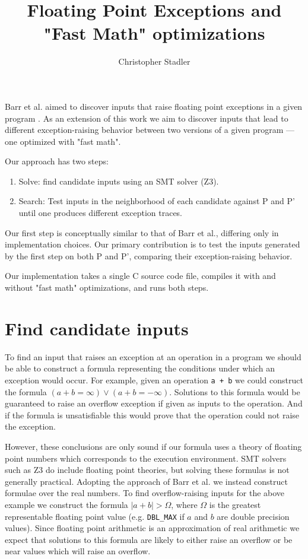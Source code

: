 \documentclass{article}
\begin{document}
\title{Floating Point Exceptions and "Fast Math" optimizations}
\author{Christopher Stadler}

Barr et al. aimed to discover inputs that raise floating point exceptions
in a given program \cite{barr_automatic_2013}. As an extension of this work we
aim to discover inputs that lead to different exception-raising behavior between
two versions of a given program — one optimized with "fast math".

Our approach has two steps:
\begin{enumerate}
  \item Solve: find candidate inputs using an SMT solver (Z3).
  \item Search: Test inputs in the neighborhood of each candidate against P and
P' until one produces different exception traces.
\end{enumerate}

Our first step is conceptually similar to that of Barr et al., differing
only in implementation choices. Our primary contribution is to test the inputs
generated by the first step on both P and P', comparing their exception-raising
behavior.

Our implementation takes a single C source code file, compiles it with and
without "fast math" optimizations, and runs both steps.

\section{Find candidate inputs}

To find an input that raises an exception at an operation in a program we should
be able to construct a formula representing the conditions under which an
exception would occur. For example, given an operation \texttt{a + b} we could
construct the formula $(a + b = \infty) \lor (a + b = -\infty)$. Solutions to
this formula would be guaranteed to raise an overflow exception if given as
inputs to the operation. And if the formula is unsatisfiable this would prove
that the operation could not raise the exception.

However, these conclusions are only sound if our formula uses a theory of
floating point numbers which corresponds to the execution environment. SMT
solvers such as Z3 do include floating point theories, but solving these
formulas is not generally practical. Adopting the approach of Barr et al. we
instead construct formulae over the real numbers. To find overflow-raising
inputs for the above example we construct the formula $|a + b| > \Omega$, where
$\Omega$ is the greatest representable floating point value (e.g.
\texttt{DBL\_MAX} if $a$ and $b$ are double precision values). Since floating
point arithmetic is an approximation of real arithmetic we expect that solutions
to this formula are likely to either raise an overflow or be near values which
will raise an overflow.
\end{document}
